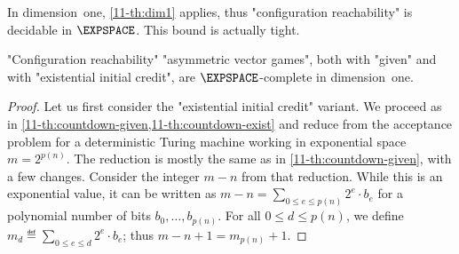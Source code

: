 In dimension~one, \cref{11-th:dim1} applies, thus "configuration
reachability" is decidable in $\EXPSPACE$.  This bound is actually
tight.
\begin{theorem}
\label{11-th:asym-dim1}
  "Configuration reachability" "asymmetric vector games", both with
  "given" and with "existential initial credit",
  are $\EXPSPACE$-complete in dimension~one.
\end{theorem}
\begin{proof}
  Let us first consider the "existential initial credit" variant.  We
  proceed as in \cref{11-th:countdown-given,11-th:countdown-exist} and
  reduce from the acceptance problem for a deterministic Turing
  machine working in exponential space $m=2^{p(n)}$.  The reduction is
  mostly the same as in \cref{11-th:countdown-given}, with a few changes.
  Consider the integer $m-n$ from that reduction.  While this is an
  exponential value, it can be written as $m-n=\sum_{0\leq e\leq
  p(n)}2^{e}\cdot b_e$ for a polynomial number of bits $b_0,\dots,b_{p(n)}$.
  For all $0\leq d\leq p(n)$, we define $m_d\eqdef \sum_{0\leq e\leq
  d}2^{e}\cdot b_e$; thus $m-n+1=m_{p(n)}+1$.


\end{proof}
